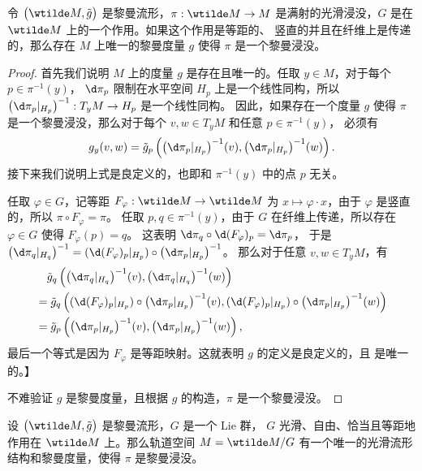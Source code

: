 \begin{theorem}
  令 $\bigl(\wtilde M,\tilde g\bigr)$ 是黎曼流形，$\pi:\wtilde M\to M$
  是满射的光滑浸没，$G$ 是在 $\wtilde M$ 上的一个作用。如果这个作用是等距的、
  竖直的并且在纤维上是传递的，那么存在 $M$ 上唯一的黎曼度量 $g$ 使得 $\pi$ 是一个黎曼浸没。
\end{theorem}
\begin{proof}
  首先我们说明 $M$ 上的度量 $g$ 是存在且唯一的。任取 $y\in M$，对于每个 $p\in\pi^{-1}(y)$，
  $\d\pi_p$ 限制在水平空间 $H_p$ 上是一个线性同构，所以 $\bigl(\d\pi_p|_{H_p}\bigr)^{-1}:T_yM\to H_p$
  是一个线性同构。
  因此，如果存在一个度量 $g$ 使得 $\pi$ 是一个黎曼浸没，那么对于每个 $v,w\in T_yM$ 和任意 $p\in \pi^{-1}(y)$，
  必须有 
  \[
    g_y(v,w)=\tilde g_p\left(
      \bigl(\d\pi_p|_{H_p}\bigr)^{-1}(v),\bigl(\d\pi_p|_{H_p}\bigr)^{-1}(w)
    \right).
  \]
  接下来我们说明上式是良定义的，也即和 $\pi^{-1}(y)$ 中的点 $p$ 无关。
  
  任取 $\varphi\in G$，记等距 $F_\varphi:\wtilde M\to\wtilde M$ 为 
  $x\mapsto \varphi\cdot x$，由于 $\varphi$ 是竖直的，所以 $\pi\circ F_\varphi=\pi$。
  任取 $p,q\in \pi^{-1}(y)$，由于 $G$ 在纤维上传递，所以存在 $\varphi\in G$ 使得 $F_\varphi(p)=q$。
  这表明 $\d\pi_q\circ \d (F_\varphi)_p=\d\pi_p$，
  于是 $\bigl(\d\pi_q|_{H_q}\bigr)^{-1}=(\d (F_\varphi)_p|_{H_p})\circ \bigl(\d\pi_p|_{H_p}\bigr)^{-1}$。
  那么对于任意 $v,w\in T_yM$，有
  \begin{align*}
    &\quad \tilde g_{q}\left(
      \bigl(\d\pi_q|_{H_q}\bigr)^{-1}(v),\bigl(\d\pi_q|_{H_q}\bigr)^{-1}(w)
    \right)\\
    &=\tilde g_{q}\left(
      (\d (F_\varphi)_p|_{H_p})\circ \bigl(\d\pi_p|_{H_p}\bigr)^{-1}(v),(\d (F_\varphi)_p|_{H_p})\circ \bigl(\d\pi_p|_{H_p}\bigr)^{-1}(w)
    \right)\\
    &=\tilde g_p\left(
      \bigl(\d\pi_p|_{H_p}\bigr)^{-1}(v),\bigl(\d\pi_p|_{H_p}\bigr)^{-1}(w)
    \right),
  \end{align*}
  最后一个等式是因为 $F_\varphi$ 是等距映射。这就表明 $g$ 的定义是良定义的，且
  是唯一的。】

  不难验证 $g$ 是黎曼度量，且根据 $g$ 的构造，$\pi$ 是一个黎曼浸没。
\end{proof}

\begin{corollary}
  设 $\bigl(\wtilde M,\tilde g\bigr)$ 是黎曼流形，$G$ 是一个 Lie 群，
  $G$ 光滑、自由、恰当且等距地作用在 $\wtilde M$ 上。那么轨道空间 $M=\wtilde M/G$
  有一个唯一的光滑流形结构和黎曼度量，使得 $\pi$ 是黎曼浸没。
\end{corollary}


